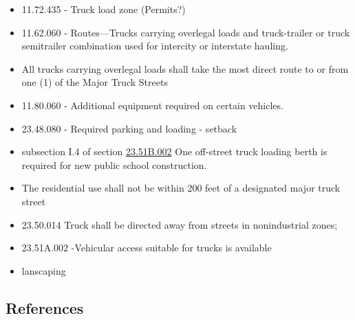 \documentclass[
  letterpaper,
  DIV=11,
  numbers=noendperiod]{scrartcl}
\begin{document}
\begin{itemize}
\item
  11.72.435 - Truck load zone (Permits?)
\item
  11.62.060 - Routes---Trucks carrying overlegal loads and truck-trailer
  or truck semitrailer combination used for intercity or interstate
  hauling.
\item
  All trucks carrying overlegal loads shall take the most direct route
  to or from one (1) of the Major Truck Streets
\item
  11.80.060 - Additional equipment required on certain vehicles.
\item
  23.48.080 - Required parking and loading - setback
\item
  subsection I.4 of section
  \href{https://library.municode.com/wa/seattle/codes/municipal_code?nodeId=TIT23LAUSCO_SUBTITLE_IIILAUSRE_CH23.51BPUSCREZO_23.51B.002PUSCREZO}{23.51B.002}
  One off-street truck loading berth is required for new public school
  construction.
\item
  The residential use shall not be within 200 feet of a designated major
  truck street
\item
  23.50.014 Truck shall be directed away from streets in nonindustrial
  zones;
\item
  23.51A.002 -Vehicular access suitable for trucks is available
\item
  lanscaping
\end{itemize}

\hypertarget{references}{%
\subsection{References}\label{references}}
\end{document}
